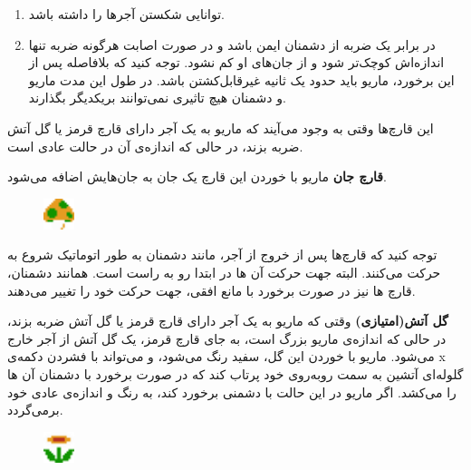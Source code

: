 \documentclass{utap}
\begin{document}
\begin{itemize}
		\begin{enumerate}
			\item
توانایی شکستن آجر‌ها را داشته باشد.
			\item
در برابر یک ضربه از دشمنان ایمن باشد و در صورت اصابت هرگونه ضربه تنها اندازه‌اش کوچک‌تر شود و از جان‌های او کم نشود. توجه کنید که بلافاصله پس از این برخورد، ماریو باید حدود یک ثانیه غیرقابل‌کشتن باشد. در طول این مدت ماریو و دشمنان هیچ تاثیری نمی‌توانند بر‌یکدیگر بگذارند.
		\end{enumerate}
		این قارچ‌ها وقتی به وجود می‌آیند که ماریو به یک آجر دارای قارچ قرمز یا گل آتش ضربه بزند، در حالی که اندازه‌ی آن در حالت عادی است.
		\newline
	\begin{minipage}{.75\textwidth}
		\item
\textbf{قارچ جان}
ماریو با خوردن این قارچ یک جان به جان‌هایش اضافه می‌شود.
\end{minipage}
\begin{minipage}{.15\textwidth}
\begin{figure}[H]
	\begin{center}
		\includegraphics[width=0.9cm]{health}
	\end{center}
\end{figure}
\end{minipage}

توجه کنید که قارچ‌ها پس از خروج از آجر، مانند دشمنان به طور اتوماتیک شروع به حرکت می‌کنند. البته جهت حرکت آن ها در ابتدا رو به راست است. همانند دشمنان، قارچ ها نیز در صورت برخورد با مانع افقی، جهت حرکت خود را تغییر می‌دهند.\newline
	
	\begin{minipage}{.75\textwidth}
		\item
		\textbf{گل آتش(امتیازی)}
		وقتی که ماریو به یک آجر دارای قارچ قرمز یا گل آتش ضربه بزند، در حالی که اندازه‌ی ماریو بزرگ است، به جای قارچ قرمز، یک گل آتش از آجر خارج می‌شود. ماریو با خوردن این گل، سفید رنگ می‌شود، و می‌تواند با فشردن دکمه‌ی x گلوله‌ای آتشین به سمت روبه‌روی خود پرتاب کند که در صورت برخورد با دشمنان آن ها را می‌کشد. اگر ماریو در این حالت با دشمنی برخورد کند، به رنگ و اندازه‌ی عادی خود برمی‌گردد.
	\end{minipage}
	\begin{minipage}{.15\textwidth}
		\begin{figure}[H]
			\begin{center}
				\includegraphics[width=0.9cm]{flower}
			\end{center}
		\end{figure}
	\end{minipage}
	

	\end{itemize}
\end{document}
